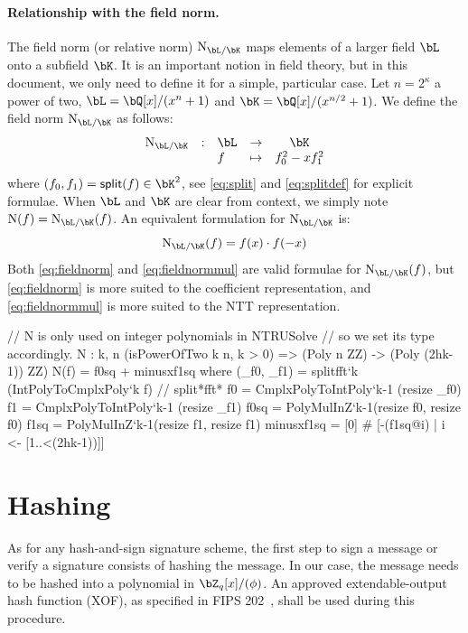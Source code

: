  \paragraph{Relationship with the field norm.} The field norm (or relative norm) $\N_{\bL/\bK}$ maps elements of a larger field $\bL$ onto a subfield $\bK$. It is an important notion in field theory, but in this document, we only need to define it for a simple, particular case. Let $n = 2^\kappa$ a power of two, $\bL = \bQ[x]/(x^{n} + 1)$ and $\bK = \bQ[x]/(x^{n/2} + 1)$. We define the field norm $\N_{\bL/\bK}$ as follows:
 \begin{equation}\label{eq:fieldnorm}
 \begin{array}{llllc}
 \N_{\bL/\bK} & : & \bL & \rightarrow & \bK \\
 & & f & \mapsto & f_0^2 - x f_1^2
 \end{array}
 \end{equation}
 where $(f_0,f_1) = \polsplit(f) \in \bK^2$, see \eqref{eq:split} and \eqref{eq:splitdef} for explicit formulae. When $\bL$ and $\bK$ are clear from context, we simply note $\N(f) = \N_{\bL/\bK}(f)$. An equivalent formulation for $\N_{\bL/\bK}$ is:
 \begin{equation}\label{eq:fieldnormmul}
 \N_{\bL/\bK} (f) = f(x) \cdot f(-x)
 \end{equation}
 Both \eqref{eq:fieldnorm} and \eqref{eq:fieldnormmul} are valid formulae for $\N_{\bL/\bK}(f)$, but \eqref{eq:fieldnorm} is more suited to the coefficient representation, and \eqref{eq:fieldnormmul} is more suited to the NTT representation.

\begin{code}
  // N is only used on integer polynomials in NTRUSolve
  // so we set its type accordingly.
  N : {k, n} (isPowerOfTwo k n, k > 0) =>
    (Poly n ZZ) -> (Poly (2^^(k-1)) ZZ)
  N(f) = f0sq + minusxf1sq where 
    (_f0, _f1) = splitfft`{k} (IntPolyToCmplxPoly`{k} f) // split*fft*
    f0 = CmplxPolyToIntPoly`{k-1} (resize _f0)
    f1 = CmplxPolyToIntPoly`{k-1} (resize _f1)
    f0sq = PolyMulInZ`{k-1}(resize f0, resize f0)
    f1sq = PolyMulInZ`{k-1}(resize f1, resize f1)
    minusxf1sq = [0] # [-(f1sq@i) | i <- [1..<(2^^(k-1))]]
\end{code}

 \section{Hashing} \label{sec:spec:hash}

As for any hash-and-sign signature scheme, the first step to sign a message or verify a signature consists of hashing the message. In our case, the message needs to be hashed into a polynomial in $\bZ_q[x]/(\phi)$. An approved extendable-output hash function (XOF), as specified in FIPS 202~\cite{FIPS}, shall be used during this procedure.

